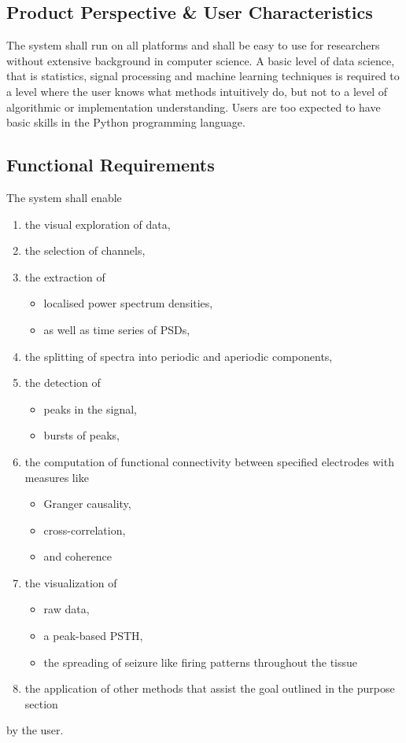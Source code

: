 \documentclass[a4paper]{article}
\begin{document}
	\subsection{Product Perspective \& User Characteristics}
		The system shall run on all platforms and shall be easy to use for researchers without extensive background in computer science. 
		A basic level of data science, that is statistics, signal processing and machine learning techniques is required to a level where the user knows what methods intuitively do, but not to a level of algorithmic or implementation understanding. 
		Users are too expected to have basic skills in the Python programming language.

	\subsection{Functional Requirements}
	 The system shall enable
		\begin{enumerate}
		 \item the visual exploration of data,
		 \item the selection of channels,
		 
		 \item the extraction of 
		 \begin{itemize}
		  \item localised power spectrum densities,
		  \item as well as time series of PSDs,
		 \end{itemize}

		 \item the splitting of spectra into periodic and aperiodic components,
		 
		 \item the detection of
		 \begin{itemize}
		  \item peaks in the signal,
		  \item bursts of peaks,
		 \end{itemize}

		 \item the computation of functional connectivity between specified electrodes with measures like 
		 \begin{itemize}
		  \item Granger causality,
		  \item cross-correlation,
		  \item and coherence
		 \end{itemize}

		 \item the visualization of 
			\begin{itemize}
			 \item raw data,
			 \item a peak-based PSTH,
			 \item the spreading of seizure like firing patterns throughout the tissue
			\end{itemize}
			
		 \item the application of other methods that assist the goal outlined in the purpose section
		\end{enumerate}
		by the user. \\
\end{document}
